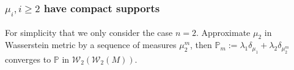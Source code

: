 
\subsubsection{$\mu_i, i \geq 2$ have compact supports}

For simplicity that we only consider the case $n=2$.
Approximate $\mu_2$ in Wasserstein metric by a sequence of measures $\mu_2^{m}$,
then $\mathbb{P}_m := \lambda_1 \delta_{\mu_1} + \lambda_2 \delta_{\mu_2^m}$ converges to $\mathbb{P}$
in $\mathcal{W}_2(\mathcal{W}_2(M))$.

